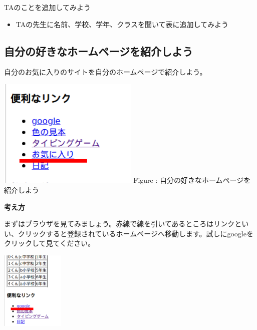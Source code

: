 \documentclass[a4paper,12pt]{jarticle}
\begin{document}
TAのことを追加してみよう

\begin{itemize}
  \item
        TAの先生に名前、学校、学年、クラスを聞いて表に追加してみよう
\end{itemize}

\bigskip

\clearpage

\subsection{\theExercise 自分の好きなホームページを紹介しよう}
自分のお気に入りのサイトを自分のホームページで紹介しよう。



\centering
\begin{minipage}{7.593cm}
  {\upshape
    \includegraphics[width=6.71cm,height=5.221cm]{textbook-img193.png}
    \newline
    Figure :
    自分の好きなホームページを紹介しよう}
\end{minipage}



\bigskip

\flushleft

\textbf{考え方}



まずはブラウザを見てみましょう。赤線で線を引いてあるところはリンクといい、クリックすると登録されているホームページへ移動します。試しにgoogleをクリックして見てください。


\bigskip

\centering
\includegraphics[width=3.029cm,height=3.743cm]{textbook-img194.png}
\end{document}
